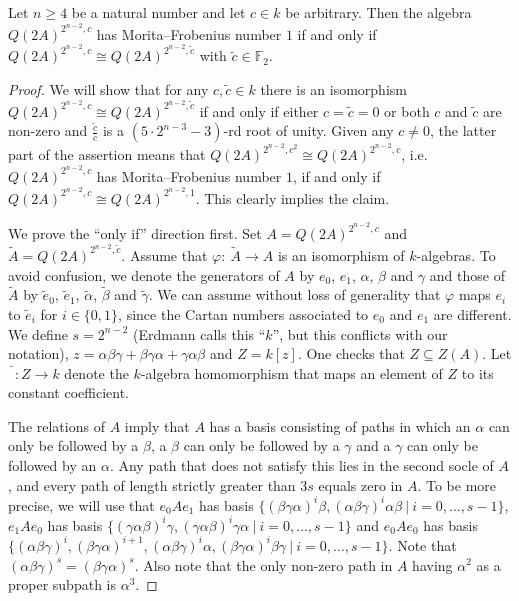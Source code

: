 \documentclass[10pt,a4paper]{amsart}
\begin{document}
\begin{Proposition}\label{prop:Q2A}
  Let $n\geq 4$ be a natural number and let $c\in k$ be arbitrary. Then the algebra $Q(2A)^{2^{n-2},c}$ has Morita--Frobenius number $1$ if and only if $Q(2A)^{2^{n-2},c} \cong Q(2A)^{2^{n-2},\tilde c}$ with $\tilde c\in \mathbb F_2$.
\end{Proposition}

\begin{proof}
  We will show that for any $c,\tilde c\in k$ there is an isomorphism $Q(2A)^{2^{n-2},c} \cong Q(2A)^{2^{n-2},\tilde c}$ if and only if either $c=\tilde c=0$ or both $c$ and $\tilde c$ are non-zero and $\frac{\tilde c}{c}$ is a $(5\cdot 2^{n-3}-3)$-rd root of unity. Given any $c\neq 0$, the latter part of the assertion means that $Q(2A)^{2^{n-2},c^2} \cong Q(2A)^{2^{n-2},c}$, i.e. $Q(2A)^{2^{n-2},c}$ has Morita--Frobenius number $1$, if and only if $Q(2A)^{2^{n-2},c} \cong Q(2A)^{2^{n-2},1}$. This clearly implies the claim. 

  We prove the ``only if'' direction first. Set $A=Q(2A)^{2^{n-2},c}$ and $\tilde A=Q(2A)^{2^{n-2},\tilde c}$. Assume that $\varphi:\ \tilde A \longrightarrow A$ is an isomorphism of $k$-algebras. To avoid confusion, we denote the generators of $A$ by $e_0$, $e_1$, $\alpha$, $\beta$ and $\gamma$ and those of $\tilde A$ by $\tilde e_0$, $\tilde e_1$, $\tilde \alpha$, $\tilde \beta$ and $\tilde \gamma$. We can assume without loss of generality that $\varphi$ maps $e_i$ to $\tilde e_i$ for $i\in\{0,1\}$, since the Cartan numbers associated to $e_0$ and $e_1$ are different. 
  We define $s=2^{n-2}$ (Erdmann calls this ``$k$'', but this conflicts with our notation), $z=\alpha\beta\gamma+\beta\gamma\alpha+\gamma\alpha\beta$ and $Z=k[z]$.  One checks that $Z\subseteq Z(A)$. Let $\bar{\phantom{f}}: Z\longrightarrow k$ denote the $k$-algebra homomorphism that maps an element of $Z$ to its constant coefficient. 
  
  The relations of $A$ imply that $A$ has a basis consisting of paths in which an $\alpha$ can only be followed by a $\beta$, a $\beta$ can only be followed by a $\gamma$ and a $\gamma$ can only be followed by an $\alpha$. Any path that does not satisfy this lies in the second socle of $A$, and every path of length strictly greater than $3s$ equals zero in $A$. To be more precise, we will use that
  $e_0Ae_1$ has basis $\{ (\beta\gamma\alpha)^i \beta, (\alpha\beta\gamma)^i \alpha\beta \ | \ i=0,\ldots,s-1\}$, 
   $e_1Ae_0$ has basis $\{ (\gamma\alpha\beta)^i \gamma, (\gamma\alpha\beta)^i \gamma\alpha \ | \ i=0,\ldots,s-1\}$ and 
   $e_0Ae_0$ has basis $\{(\alpha\beta\gamma)^i, (\beta\gamma\alpha)^{i+1}, (\alpha\beta\gamma)^i\alpha, (\beta\gamma\alpha)^i\beta\gamma \ | \ i=0,\ldots,s-1\}$. Note that $(\alpha\beta\gamma)^s=(\beta\gamma\alpha)^s$. Also note that the only non-zero path in $A$ having $\alpha^2$ as a proper subpath is $\alpha^3$.


\end{proof}
\end{document}
